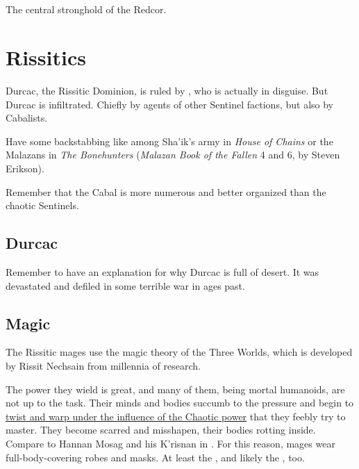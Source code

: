 \subsection{\TopazChateau}
\label{Topaz Chateau}
The central stronghold of the Redcor. 















\section{Rissitics}
Durcac, the Rissitic Dominion, is ruled by \HriistN, who is actually \HriistD{} in disguise. But Durcac is infiltrated. Chiefly by agents of other Sentinel factions, but also by Cabalists. 

Have some backstabbing like among Sha'ik's army in \emph{House of Chains} or the Malazans in \emph{The Bonehunters} (\emph{Malazan Book of the Fallen} 4 and 6, by Steven Erikson). 

Remember that the Cabal is more numerous and better organized than the chaotic Sentinels. 







\subsection{Durcac}
Remember to have an explanation for why Durcac is full of desert. It was devastated and defiled in some terrible war in ages past. 







\subsection{Magic}
The Rissitic mages use the magic theory of the Three Worlds, which is developed by Rissit Nechsain from millennia of research. 

The power they wield is great, and many of them, being mortal humanoids, are not up to the task. Their minds and bodies succumb to the pressure and begin to \hyperref[The price of magic]{twist and warp under the influence of the Chaotic power} that they feebly try to master. They become scarred and misshapen, their bodies rotting inside. Compare to Hannan Mosag and his K'risnan in \SEMalazan. For this reason, mages wear full-body-covering robes and masks. At least the \Shessefkesad, and likely the \Dzeyrgvin{}, too. 

